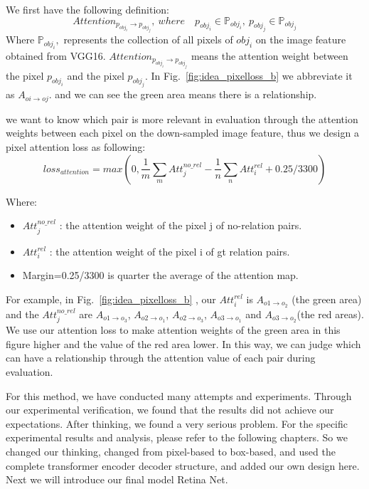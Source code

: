 We first have the following definition: 
$$ Attention_{p_{obj_i}\to p_{obj_j}},\ where \quad p_{obj_i} \in \mathbb{P}_{obj_i},\  p_{obj_j} \in \mathbb{P}_{obj_j} $$
Where $ \mathbb{P}_{obj_i}, $ represents the collection of all pixels of $ obj_i $ on the image feature obtained from VGG16. $  Attention_{p_{obj_i}\to p_{obj_j}} $ means the attention weight between the pixel $ p_{obj_i} $ and the pixel $ p_{obj_j} $. In Fig.~\ref{fig:idea_pixelloss_b} we abbreviate it as $ A_{oi \to oj} $. and we can see the green area means there is a relationship.



we want to know which pair is more relevant in evaluation through the attention weights between each pixel on the down-sampled image feature, thus we design a pixel attention loss as following:
\begin{equation}\label{pixel_attention_loss}
	loss_{attention}=max(0, \frac{1}{m}\sum_{m}Att_j^{no\_rel}-\frac{1}{n}\sum_{n}Att_i^{rel}+0.25
	/3300)
\end{equation}

Where:

\begin{itemize}
	\item $ Att_j^{no\_rel} $ : the attention weight of the pixel j of no-relation pairs.
	\item $ Att_i^{rel} $ :  the attention weight of the pixel i of gt relation pairs.
	\item Margin=0.25/3300 is quarter the average of the attention map.
\end{itemize}

For example, in Fig.~\ref{fig:idea_pixelloss_b} , our $Att_i^{rel} $  is $ A_{o1 \to o_2} $ (the green area) and  the $ Att_j^{no\_rel} $ are $ A_{o1 \to o_3}  $,  $ A_{o2 \to o_1}  $, $ A_{o2 \to o_3}  $, $ A_{o3 \to o_1}  $ and $ A_{o3\to o_2}  $(the red areas). We use our attention loss to make attention weights of the green area in this figure higher and the value of the red area lower. In this way, we can judge which can have a relationship through the attention value of each pair during evaluation.

For this method, we have conducted many attempts and experiments. Through our experimental verification, we found that the results did not achieve our expectations. After thinking, we found a very serious problem. For the specific experimental results and analysis, please refer to the following chapters. So we changed our thinking, changed from pixel-based to box-based, and used the complete transformer encoder decoder structure, and added our own design here. Next we will introduce our final model Retina Net.

